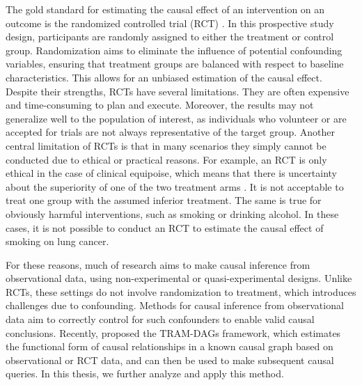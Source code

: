 The gold standard for estimating the causal effect of an intervention on an outcome is the randomized controlled trial (RCT) \citep{hariton2018}. In this prospective study design, participants are randomly assigned to either the treatment or control group. Randomization aims to eliminate the influence of potential confounding variables, ensuring that treatment groups are balanced with respect to baseline characteristics. This allows for an unbiased estimation of the causal effect. Despite their strengths, RCTs have several limitations. They are often expensive and time-consuming to plan and execute. Moreover, the results may not generalize well to the population of interest, as individuals who volunteer or are accepted for trials are not always representative of the target group. Another central limitation of RCTs is that in many scenarios they simply cannot be conducted due to ethical or practical reasons. For example, an RCT is only ethical in the case of clinical equipoise, which means that there is uncertainty about the superiority of one of the two treatment arms \citep{freedman1987}. It is not acceptable to treat one group with the assumed inferior treatment. The same is true for obviously harmful interventions, such as smoking or drinking alcohol. In these cases, it is not possible to conduct an RCT to estimate the causal effect of smoking on lung cancer. 

For these reasons, much of research aims to make causal inference from observational data, using non-experimental or quasi-experimental designs. Unlike RCTs, these settings do not involve randomization to treatment, which introduces challenges due to confounding. Methods for causal inference from observational data aim to correctly control for such confounders to enable valid causal conclusions. Recently, \citet{sick2025} proposed the TRAM-DAGs framework, which estimates the functional form of causal relationships in a known causal graph based on observational or RCT data, and can then be used to make subsequent causal queries. In this thesis, we further analyze and apply this method.

